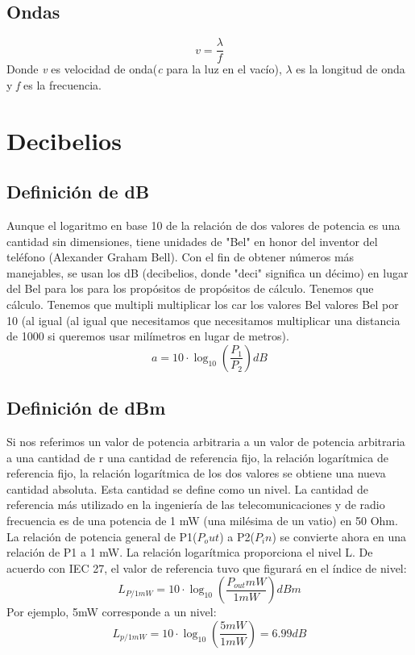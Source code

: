 \documentclass[
	11pt, %
	fleqn, %
	a4paper, %
]{LegrandOrangeBook}
\begin{document}
\section{Ondas}
\begin{equation}
\label{art:onda y velocidad}
v=\frac{\lambda}{f}
\end{equation}
Donde \textit{v} es velocidad de onda(\textit{c} para la luz en el vacío), $\lambda$ es la longitud de onda y \textit{f} es la frecuencia.
\chapter{Decibelios}\label{chap:decibelios}
\section{Definición de dB}
Aunque el logaritmo en base 10 de la relación de dos valores de potencia es una cantidad sin dimensiones, tiene unidades de "Bel" en honor del inventor del teléfono (Alexander Graham Bell). Con el fin de obtener números más manejables, se usan los dB (decibelios, donde "deci" significa un décimo) en lugar del Bel  para los  para los propósitos de propósitos de cálculo. Tenemos que cálculo. Tenemos que multipli multiplicar los car los valores Bel valores Bel por 10 (al igual (al igual que necesitamos que necesitamos multiplicar una distancia de 1000 si queremos usar milímetros en lugar de metros).
\begin{equation}
\label{art:decibel}
a=10\cdot \log_{10}\left(\frac{P_1}{P_2}\right)dB
\end{equation}
\section{Definición de dBm}
Si nos referimos un valor de potencia arbitraria a un valor de potencia arbitraria a una cantidad de r una cantidad de referencia fijo, la relación logarítmica de referencia fijo, la relación logarítmica de los dos valores se obtiene una nueva cantidad absoluta. Esta cantidad se define como un nivel. La cantidad de referencia más utilizado en la ingeniería de las telecomunicaciones y de radio frecuencia es de una potencia de 1 mW (una milésima de un vatio) en 50 Ohm. La relación de potencia general de P1($P_out$) a P2($P_in$) se convierte ahora en una relación de P1 a 1 mW. La relación logarítmica proporciona el nivel L. De acuerdo con IEC 27, el valor de referencia tuvo que figurará en el índice de nivel:
\begin{equation}
\label{art:dbm}
L_{P/1mW}=10\cdot \log_{10}\left(\frac{P_{out}mW}{1mW}\right)dBm
\end{equation}
Por ejemplo, 5mW corresponde a un nivel:
\begin{displaymath}
L_{p/1mW}=10\cdot \log_{10}\left(\frac{5mW}{1mW}\right)=6.99dB
\end{displaymath}
\end{document}
